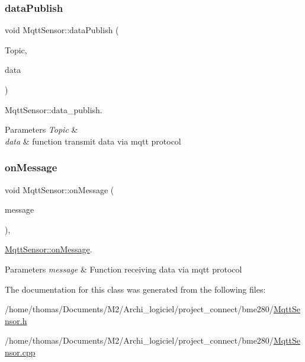 \subsubsection{\texorpdfstring{data\+Publish}{dataPublish}}
{\footnotesize\ttfamily void Mqtt\+Sensor\+::data\+Publish (\begin{DoxyParamCaption}\item[{Q\+String}]{Topic,  }\item[{Q\+Json\+Object}]{data }\end{DoxyParamCaption})\hspace{0.3cm}{\ttfamily [slot]}}



Mqtt\+Sensor\+::data\+\_\+publish. 


\begin{DoxyParams}{Parameters}
{\em Topic} & \\
\hline
{\em data} & function transmit data via mqtt protocol \\
\hline
\end{DoxyParams}
\mbox{\label{classMqttSensor_a5ced2fd35046b8306902358860cb3dce}} 
\subsubsection{\texorpdfstring{on\+Message}{onMessage}}
{\footnotesize\ttfamily void Mqtt\+Sensor\+::on\+Message (\begin{DoxyParamCaption}\item[{Q\+Mqtt\+Message}]{message }\end{DoxyParamCaption})\hspace{0.3cm}{\ttfamily [override]}, {\ttfamily [slot]}}



\hyperlink{classMqttSensor_a5ced2fd35046b8306902358860cb3dce}{Mqtt\+Sensor\+::on\+Message}. 


\begin{DoxyParams}{Parameters}
{\em message} & Function receiving data via mqtt protocol \\
\hline
\end{DoxyParams}


The documentation for this class was generated from the following files\+:\begin{DoxyCompactItemize}
\item 
/home/thomas/\+Documents/\+M2/\+Archi\+\_\+logiciel/project\+\_\+connect/bme280/\hyperlink{MqttSensor_8h}{Mqtt\+Sensor.\+h}\item 
/home/thomas/\+Documents/\+M2/\+Archi\+\_\+logiciel/project\+\_\+connect/bme280/\hyperlink{MqttSensor_8cpp}{Mqtt\+Sensor.\+cpp}\end{DoxyCompactItemize}
